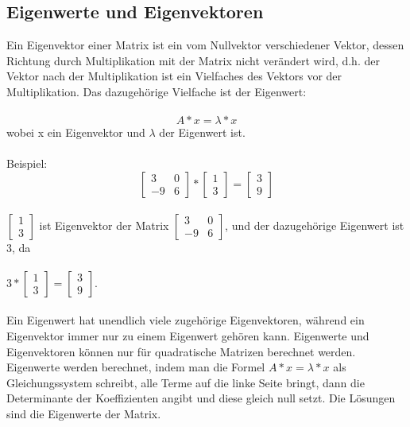 \documentclass[11pt]{scrreprt}
\begin{document}
\subsection{Eigenwerte und Eigenvektoren}
 Ein Eigenvektor einer Matrix ist ein vom Nullvektor verschiedener Vektor, dessen Richtung durch Multiplikation mit der Matrix nicht verändert wird, d.h. der Vektor nach der Multiplikation ist ein Vielfaches des Vektors vor der Multiplikation. Das dazugehörige Vielfache ist der Eigenwert:\\
\\
\begin{equation}
A * x = \lambda * x
\end{equation}
wobei x ein Eigenvektor und  $\lambda$  der Eigenwert ist.\\
\\
Beispiel:
\begin{equation}
\begin{bmatrix}
3  & 0\\
-9 & 6 
\end {bmatrix}
*
\begin{bmatrix}
1 \\ 
3  
\end {bmatrix}
=
\begin{bmatrix}
3 \\
9  
\end {bmatrix}
\end{equation}
\\
$\begin{bmatrix}
1 \\ 
3  
\end {bmatrix}$ ist Eigenvektor der Matrix $\begin{bmatrix}
3  & 0 \\
-9 & 6 
\end {bmatrix}$, und der dazugehörige Eigenwert ist 3, da \\
\\
$3*\begin{bmatrix}
1 \\ 
3  
\end {bmatrix} 
=
\begin{bmatrix}
3  \\
9  
\end {bmatrix}
$.\\
\\
Ein Eigenwert hat unendlich viele zugehörige Eigenvektoren, während ein Eigenvektor immer nur zu einem Eigenwert gehören kann. Eigenwerte und Eigenvektoren können nur für quadratische Matrizen berechnet werden. Eigenwerte werden berechnet, indem man die Formel $A*x = \lambda * x$ als Gleichungssystem schreibt, alle Terme auf die linke Seite bringt, dann die Determinante der Koeffizienten angibt und diese gleich null setzt. Die Lösungen sind die Eigenwerte der Matrix.
\end{document}

